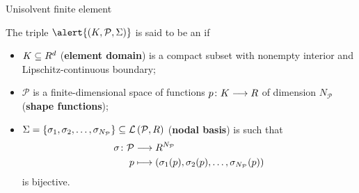 
\begin{frame}{Unisolvent finite element}

\begin{definicion}
	The triple $\alert{\left(K,\mathcal{P},\Sigma\right)}$ is said to be an  if
	\begin{itemize}
		\item $K\subseteq \relax R^d$ (\textbf{element domain}) is a compact subset with nonempty interior and Lipschitz-continuous boundary;
		\item $\mathcal{P}$ is a finite-dimensional space of functions $p\colon K\longrightarrow\relax R$ of dimension $N_\mathcal{P}$ (\textbf{shape functions});
		\item $\Sigma=\left\{\sigma_1,\sigma_2,\ldots,\sigma_{N_\mathcal{P}}\right\}\subseteq\mathcal{L}\left(\mathcal{P},\relax R\right)$ (\textbf{nodal basis}) is such that
		\begin{align*}
		\sigma\colon\mathcal{P}&\longrightarrow \relax R^{N_\mathcal{P}}\\
		p&\longmapsto \left(\sigma_1(p),\sigma_2(p),\ldots,\sigma_{N_\mathcal{P}}(p)\right)
		\end{align*}
		is bijective.
	\end{itemize}
\end{definicion}

\end{frame}

